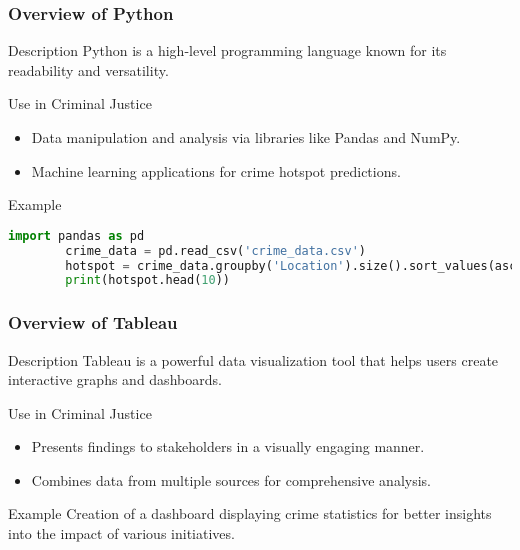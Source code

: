 \documentclass[aspectratio=169]{beamer}
\begin{document}
\begin{frame}[fragile]
    \frametitle{Overview of Python}
    \begin{block}{Description}
        Python is a high-level programming language known for its readability and versatility.
    \end{block}
    \begin{block}{Use in Criminal Justice}
        \begin{itemize}
            \item Data manipulation and analysis via libraries like Pandas and NumPy.
            \item Machine learning applications for crime hotspot predictions.
        \end{itemize}
    \end{block}
    \begin{block}{Example}
        \begin{lstlisting}[language=Python]
        import pandas as pd
        crime_data = pd.read_csv('crime_data.csv')
        hotspot = crime_data.groupby('Location').size().sort_values(ascending=False)
        print(hotspot.head(10))
        \end{lstlisting}
    \end{block}
\end{frame}

\begin{frame}[fragile]
    \frametitle{Overview of Tableau}
    \begin{block}{Description}
        Tableau is a powerful data visualization tool that helps users create interactive graphs and dashboards.
    \end{block}
    \begin{block}{Use in Criminal Justice}
        \begin{itemize}
            \item Presents findings to stakeholders in a visually engaging manner.
            \item Combines data from multiple sources for comprehensive analysis.
        \end{itemize}
    \end{block}
    \begin{block}{Example}
        Creation of a dashboard displaying crime statistics for better insights into the impact of various initiatives.
    \end{block}
\end{frame}
\end{document}
